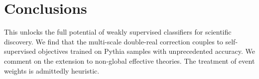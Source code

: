 \section{Conclusions}\label{sec:conclusions}

This unlocks the full potential of weakly supervised classifiers for
scientific discovery. We find that the multi-scale double-real
correction couples to self-supervised objectives trained on Pythia
samples with unprecedented accuracy. We comment on the extension to
non-global effective theories. The treatment of event weights is
admittedly heuristic.

